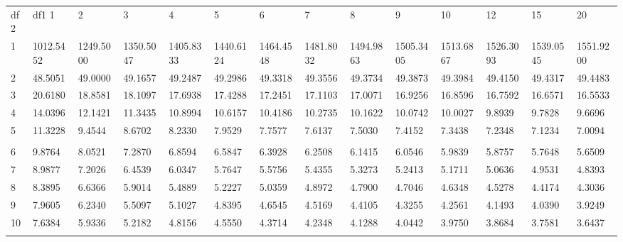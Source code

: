  {
 \fontsize{5pt}{5pt}
 \selectfont
\begin{tabular}{l|lllllllllllll} 
df2  & df1      1  &      2  &      3  &      4  &      5  &      6  &      7  &      8  &      9  &     10  &     12  &     15  &     20   \\ 
  1 & 1012.5452 & 1249.5000 & 1350.5047 & 1405.8333 & 1440.6124 & 1464.4548 & 1481.8032 & 1494.9863 & 1505.3405 & 1513.6867 & 1526.3093 & 1539.0545 & 1551.9200 \\[5pt] \arrayrulecolor{light-gray}\hline\arrayrulecolor{black}  
  2 & 48.5051 & 49.0000 & 49.1657 & 49.2487 & 49.2986 & 49.3318 & 49.3556 & 49.3734 & 49.3873 & 49.3984 & 49.4150 & 49.4317 & 49.4483 \\[5pt] \arrayrulecolor{light-gray}\hline\arrayrulecolor{black}  
  3 & 20.6180 & 18.8581 & 18.1097 & 17.6938 & 17.4288 & 17.2451 & 17.1103 & 17.0071 & 16.9256 & 16.8596 & 16.7592 & 16.6571 & 16.5533 \\[5pt] \arrayrulecolor{light-gray}\hline\arrayrulecolor{black}  
  4 & 14.0396 & 12.1421 & 11.3435 & 10.8994 & 10.6157 & 10.4186 & 10.2735 & 10.1622 & 10.0742 & 10.0027 & 9.8939 & 9.7828 & 9.6696 \\[5pt] \arrayrulecolor{light-gray}\hline\arrayrulecolor{black}  
  5 & 11.3228 & 9.4544 & 8.6702 & 8.2330 & 7.9529 & 7.7577 & 7.6137 & 7.5030 & 7.4152 & 7.3438 & 7.2348 & 7.1234 & 7.0094 \\[5pt] \arrayrulecolor{light-gray}\hline\arrayrulecolor{black}  
\\ 
  6 & 9.8764 & 8.0521 & 7.2870 & 6.8594 & 6.5847 & 6.3928 & 6.2508 & 6.1415 & 6.0546 & 5.9839 & 5.8757 & 5.7648 & 5.6509 \\[5pt] \arrayrulecolor{light-gray}\hline\arrayrulecolor{black}  
  7 & 8.9877 & 7.2026 & 6.4539 & 6.0347 & 5.7647 & 5.5756 & 5.4355 & 5.3273 & 5.2413 & 5.1711 & 5.0636 & 4.9531 & 4.8393 \\[5pt] \arrayrulecolor{light-gray}\hline\arrayrulecolor{black}  
  8 & 8.3895 & 6.6366 & 5.9014 & 5.4889 & 5.2227 & 5.0359 & 4.8972 & 4.7900 & 4.7046 & 4.6348 & 4.5278 & 4.4174 & 4.3036 \\[5pt] \arrayrulecolor{light-gray}\hline\arrayrulecolor{black}  
  9 & 7.9605 & 6.2340 & 5.5097 & 5.1027 & 4.8395 & 4.6545 & 4.5169 & 4.4105 & 4.3255 & 4.2561 & 4.1493 & 4.0390 & 3.9249 \\[5pt] \arrayrulecolor{light-gray}\hline\arrayrulecolor{black}  
 10 & 7.6384 & 5.9336 & 5.2182 & 4.8156 & 4.5550 & 4.3714 & 4.2348 & 4.1288 & 4.0442 & 3.9750 & 3.8684 & 3.7581 & 3.6437 \\[5pt] \arrayrulecolor{light-gray}\hline\arrayrulecolor{black}  

\end{tabular}}
